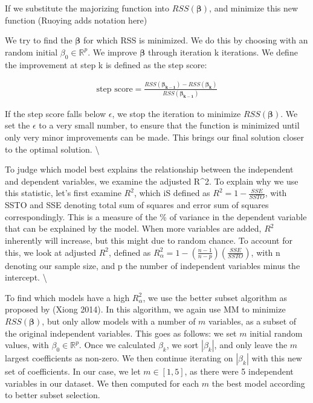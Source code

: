 \documentclass[
]{article}
\begin{document}
If we substitute the majorizing function into
\(RSS (\boldsymbol{\beta})\), and minimize this new function (Ruoying
adds notation here)

We try to find the \(\boldsymbol{\beta}\) for which RSS is minimized. We
do this by choosing with an random initial \(\beta_0\in\mathbb{R}^p\).
We improve \(\boldsymbol{\beta}\) through iteration k iterations. We
define the improvement at step k is defined as the step score:

\begin{align}
 \text{step score} = \frac{RSS (\boldsymbol{\beta_{k-1}}) - RSS (\boldsymbol{\beta_{k}})}{RSS (\boldsymbol{\beta_{k-1}})}
\end{align}

If the step score falls below \(\epsilon\), we stop the iteration to
minimize \(RSS (\boldsymbol{\beta})\). We set the \(\epsilon\) to a very
small number, to ensure that the function is minimized until only very
minor improvements can be made. This brings our final solution closer to
the optimal solution. \textbackslash{}

To judge which model best explains the relationship between the
independent and dependent variables, we examine the adjusted R\^{}2. To
explain why we use this statistic, let's first examine \(R^2\), which iS
defined as \(R^2 = 1 - \frac{SSE}{SSTO}\), with SSTO and SSE denoting
total sum of squares and error sum of squares correspondingly. This is a
measure of the \% of variance in the dependent variable that can be
explained by the model. When more variables are added, \(R^2\)
inherently will increase, but this might due to random chance. To
account for this, we look at adjusted \(R^2\), defined as
\(R^2_\alpha = 1 - (\frac{n-1}{n-p})(\frac{SSE}{SSTO})\), with n
denoting our sample size, and p the number of independent variables
minus the intercept. \textbackslash{}

To find which models have a high \(R^2_\alpha\), we use the better
subset algorithm as proposed by (Xiong 2014). In this algorithm, we
again use MM to minimize \(RSS (\boldsymbol{\beta})\), but only allow
models with a number of \(m\) variables, as a subset of the original
independent variables. This goes as follows: we set \(m\) initial random
values, with \(\beta_0\in\mathbb{R}^p\). Once we calculated \(\beta_k\),
we sort \(|\beta_k|\), and only leave the \(m\) largest coefficients as
non-zero. We then continue iterating on \(|\beta_k|\) with this new set
of coefficients. In our case, we let \(m \in [1,5]\), as there were 5
independent variables in our dataset. We then computed for each \(m\)
the best model according to better subset selection.
\end{document}
